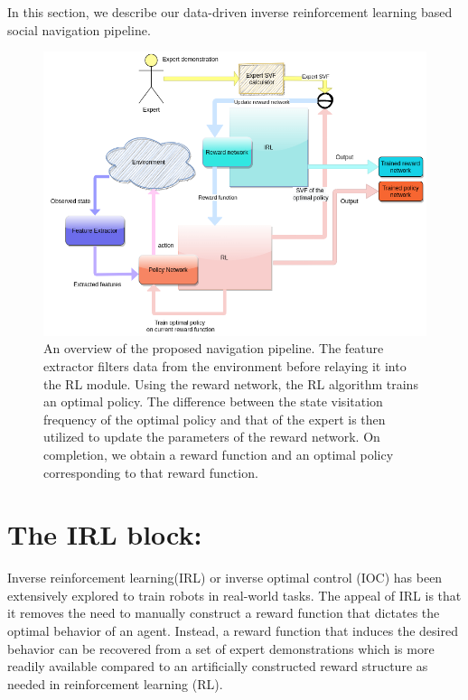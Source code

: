 \label{Ch:4}
In this section, we describe our data-driven inverse reinforcement learning based social navigation pipeline.\\

\begin{figure}[!htbp]
	\centering
	\includegraphics[width=\linewidth]{figures/irl_pipeline.png}
	\caption{An overview of the proposed navigation pipeline. The feature extractor filters data from the environment before relaying it into the RL module. Using the reward network, the RL algorithm trains an optimal policy. The difference between the state visitation frequency of the optimal policy and that of the expert is then utilized to update the parameters of the reward network. On completion, we obtain a reward function and an optimal policy corresponding to that reward function.}
	\label{fig:irl_pipeline}
\end{figure}

\section{The IRL block:}
Inverse reinforcement learning(IRL) or inverse optimal control (IOC) has been extensively explored to train robots in real-world tasks. The appeal of IRL is that it removes the need to manually construct a reward function that dictates the optimal behavior of an agent. Instead, a reward function that induces the desired behavior can be recovered from a set of expert demonstrations which is more readily available compared to an artificially constructed reward structure as needed in reinforcement learning (RL).

